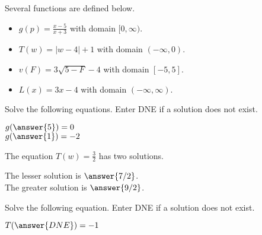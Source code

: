 \documentclass{ximera}
\begin{document}
\begin{definition}
Several functions are defined below.
\begin{itemize}
\item $g(p) = \frac{x-5}{x+3}$ with domain $[0, \infty)$. \\ \quad
\item $T(w) = | w - 4 | + 1$ with domain $(-\infty, 0)$. 
\item $v(F) = 3\sqrt{5 - F} - 4$ with domain $[-5, 5]$. 
\item $L(x) = 3x - 4$ with domain $(-\infty, \infty)$. 
\end{itemize}
\end{definition}



\begin{exercise}
Solve the following equations.  Enter DNE if a solution does not exist.

$g( \answer{5} ) = 0$   \\
$g( \answer{1} ) = -2$  

\end{exercise}




\begin{exercise}
The equation $T(w) = \frac{3}{2}$ has two solutions.  

The lesser solution is $\answer{7/2} $.  \\
The greater solution is $\answer{9/2} $.

\end{exercise}



\begin{exercise}
Solve the following equation.  Enter DNE if a solution does not exist.

$T( \answer{DNE} ) = -1$   


\end{exercise}
\end{document}
